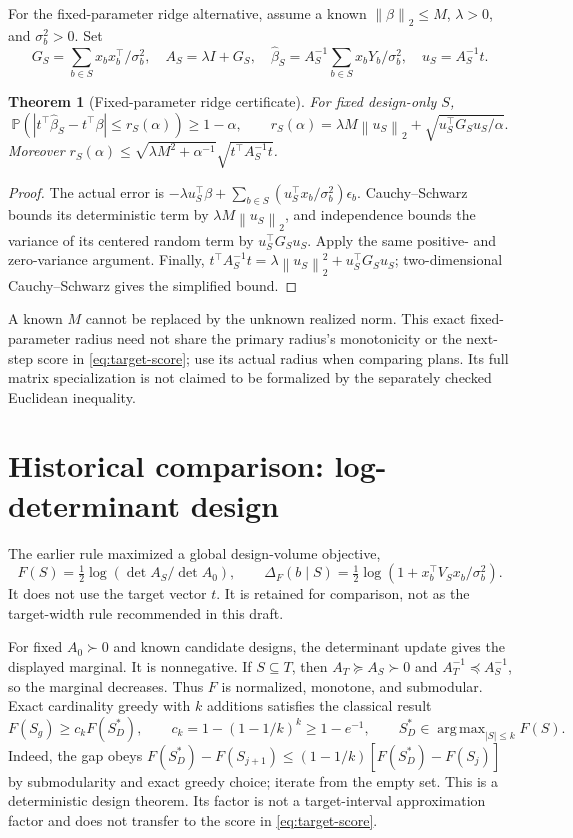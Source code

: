 \documentclass[11pt]{article}
\newtheorem{theorem}{Theorem}
\theoremstyle{remark}
\newcommand{\Prob}{\mathbb P}
\newcommand{\norm}[1]{\left\lVert #1\right\rVert_2}
\DeclareMathOperator*{\argmax}{arg\,max}
\begin{document}
For the fixed-parameter ridge alternative, assume a known $\norm{\beta}\le M$, $\lambda>0$, and $\sigma_b^2>0$. Set
\[
 G_S=\sum_{b\in S}x_bx_b^\top/\sigma_b^2,\quad
 A_S=\lambda I+G_S,\quad
 \widehat\beta_S=A_S^{-1}\sum_{b\in S}x_bY_b/\sigma_b^2,\quad
 u_S=A_S^{-1}t.
\]
\begin{theorem}[Fixed-parameter ridge certificate]\label{thm:ridge}
For fixed design-only $S$,
\[
 \Prob\left(|t^\top\widehat\beta_S-t^\top\beta|
  \le r_S(\alpha)\right)\ge1-\alpha,\qquad
 r_S(\alpha)=\lambda M\norm{u_S}
                +\sqrt{u_S^\top G_Su_S/\alpha}.
\]
Moreover $r_S(\alpha)\le\sqrt{\lambda M^2+\alpha^{-1}}
                   \sqrt{t^\top A_S^{-1}t}$.
\end{theorem}
\begin{proof}
The actual error is
$-\lambda u_S^\top\beta+\sum_{b\in S}(u_S^\top x_b/\sigma_b^2)\epsilon_b$.
Cauchy--Schwarz bounds its deterministic term by $\lambda M\norm{u_S}$, and independence bounds the variance of its centered random term by $u_S^\top G_Su_S$. Apply the same positive- and zero-variance argument. Finally,
$t^\top A_S^{-1}t=\lambda\norm{u_S}^2+u_S^\top G_Su_S$;
two-dimensional Cauchy--Schwarz gives the simplified bound.
\end{proof}
A known $M$ cannot be replaced by the unknown realized norm. This exact fixed-parameter radius need not share the primary radius's monotonicity or the next-step score in \eqref{eq:target-score}; use its actual radius when comparing plans. Its full matrix specialization is not claimed to be formalized by the separately checked Euclidean inequality.

\section{Historical comparison: log-determinant design}
\label{sec:historical}
The earlier rule maximized a global design-volume objective,
\[
 F(S)=\tfrac12\log(\det A_S/\det A_0),\qquad
 \Delta_F(b\mid S)=\tfrac12\log(1+x_b^\top V_Sx_b/\sigma_b^2).
\]
It does not use the target vector $t$. It is retained for comparison, not as the target-width rule recommended in this draft.

For fixed $A_0\succ0$ and known candidate designs, the determinant update gives the displayed marginal. It is nonnegative. If $S\subseteq T$, then $A_T\succeq A_S\succ0$ and $A_T^{-1}\preceq A_S^{-1}$, so the marginal decreases. Thus $F$ is normalized, monotone, and submodular. Exact cardinality greedy with $k$ additions satisfies the classical result~\cite{nemhauser1978analysis}
\begin{equation}
 F(S_g)\ge c_k F(S_D^*),\qquad
 c_k=1-(1-1/k)^k\ge1-e^{-1},\qquad
 S_D^*\in\argmax_{|S|\le k}F(S).                              \label{eq:logdet}
\end{equation}
Indeed, the gap obeys
$F(S_D^*)-F(S_{j+1})\le(1-1/k)[F(S_D^*)-F(S_j)]$ by submodularity and exact greedy choice; iterate from the empty set. This is a deterministic design theorem. Its factor is not a target-interval approximation factor and does not transfer to the score in \eqref{eq:target-score}.
\end{document}
